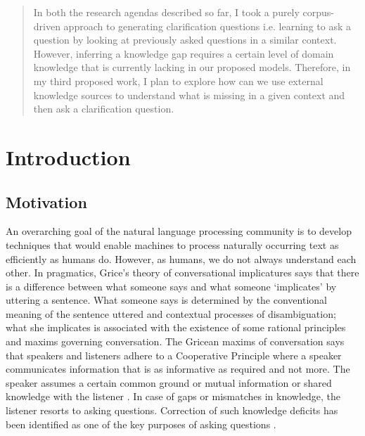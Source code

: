 \documentclass[11pt]{report}
\renewcommand\cite{\citep}	%
\begin{document}
\begin{abstract}
In both the research agendas described so far, I took a purely corpus-driven approach to generating clarification questions i.e. learning to ask a question by looking at previously asked questions in a similar context. However, inferring a knowledge gap requires a certain level of domain knowledge that is currently lacking in our proposed models. Therefore, in my third proposed work, I plan to explore how can we use external knowledge sources to understand what is missing in a given context and then ask a clarification question. 

\end{abstract}

\pagebreak

\tableofcontents
\pagebreak

\cleardoublepage
{}


\chapter{Introduction}

\section{Motivation}

An overarching goal of the natural language processing community is to develop techniques that would enable machines to process naturally occurring text as efficiently as humans do. However, as humans, we do not always understand each other. In pragmatics, Grice's theory of conversational implicatures \cite{grice1975logic} says that there is a difference between what someone says and what someone `implicates' by uttering a sentence. What someone says is determined by the conventional meaning of the sentence uttered and contextual processes of disambiguation; what she implicates is associated with the existence of some rational principles and maxims governing conversation. The Gricean maxims of conversation says that speakers and listeners adhere to a Cooperative Principle where a speaker communicates information that is as informative as required and not more. The speaker assumes a certain common ground or mutual information or shared knowledge with the listener \cite{clark1991grounding,clark1982hearers,clark1981definite}. In case of gaps or mismatches in knowledge, the listener resorts to asking questions. Correction of such knowledge deficits has been identified as one of the key purposes of asking questions \cite{graesser2008question}. \\
\end{document}
